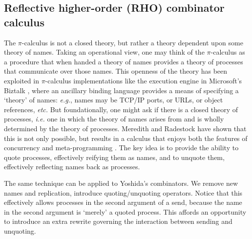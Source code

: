 \documentclass{llncs}
\makeatletter
\newcommand{\pic}{$\pi$-calculus}
\newcommand{\quotep}[1]{\mathsf{@}#1}
\newcommand{\bc}{\mathbin{\mathbf{::=}}}
\newcommand{\bm}{\mathbin{\mathbf\mid}}
\makeatother
\begin{document}
\subsection{Reflective higher-order (RHO) combinator calculus}
The {\pic} is not a closed theory, but rather a theory dependent upon
some theory of names. Taking an operational view, one may think of the
{\pic} as a procedure that when handed a theory of names provides a
theory of processes that communicate over those names. This openness
of the theory has been exploited in {\pic} implementations like the
execution engine in Microsoft's Biztalk \cite{biztalk}, where an
ancillary binding language provides a means of specifying a `theory'
of names: {\em e.g.}, names may be TCP/IP ports, or URLs, or object
references, {\em etc.}  But foundationally, one might ask if there is
a closed theory of processes, {\em i.e.} one in which the theory of
names arises from and is wholly determined by the theory of
processes. Meredith and Radestock have shown that this is not only
possible, but results in a calculus that enjoys both the features of
concurrency and meta-programming
\cite{DBLP:journals/entcs/MeredithR05}. The key idea is to provide the
ability to quote processes, effectively reifying them as names, and to
unquote them, effectively reflecting names back as processes.

The same technique can be applied to Yoshida's combinators. We remove
new names and replication, introduce quoting/unquoting
operators. Notice that this effectively allows processes in the second
argument of a send, because the name in the second argument is
`merely' a quoted process. This affords an opportunity to introduce an
extra rewrite governing the interaction between sending and unquoting.

\end{document}
